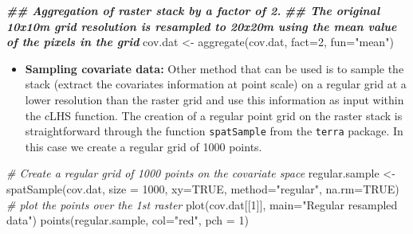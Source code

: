 \documentclass[
  10pt,
  b5paper,
  oneside]{book}
\newenvironment{Shaded}{\begin{snugshade}}{\end{snugshade}}
\newcommand{\AttributeTok}[1]{\textcolor[rgb]{0.77,0.63,0.00}{#1}}
\newcommand{\CommentTok}[1]{\textcolor[rgb]{0.56,0.35,0.01}{\textit{#1}}}
\newcommand{\ConstantTok}[1]{\textcolor[rgb]{0.00,0.00,0.00}{#1}}
\newcommand{\DecValTok}[1]{\textcolor[rgb]{0.00,0.00,0.81}{#1}}
\newcommand{\DocumentationTok}[1]{\textcolor[rgb]{0.56,0.35,0.01}{\textbf{\textit{#1}}}}
\newcommand{\FunctionTok}[1]{\textcolor[rgb]{0.00,0.00,0.00}{#1}}
\newcommand{\NormalTok}[1]{#1}
\newcommand{\OtherTok}[1]{\textcolor[rgb]{0.56,0.35,0.01}{#1}}
\newcommand{\StringTok}[1]{\textcolor[rgb]{0.31,0.60,0.02}{#1}}
\providecommand{\tightlist}{%
  \setlength{\itemsep}{0pt}\setlength{\parskip}{0pt}}
\begin{document}
\begin{Shaded}
\begin{Highlighting}[]
  \DocumentationTok{\#\# Aggregation of raster stack by a factor of 2. }
  \DocumentationTok{\#\# The original 10x10m grid resolution is resampled to 20x20m using the mean value of the pixels in the grid}
\NormalTok{    cov.dat }\OtherTok{\textless{}{-}} \FunctionTok{aggregate}\NormalTok{(cov.dat, }\AttributeTok{fact=}\DecValTok{2}\NormalTok{, }\AttributeTok{fun=}\StringTok{"mean"}\NormalTok{)}
\end{Highlighting}
\end{Shaded}

\begin{itemize}
\tightlist
\item
  \textbf{Sampling covariate data:} Other method that can be used is to sample the stack (extract the covariates information at point scale) on a regular grid at a lower resolution than the raster grid and use this information as input within the cLHS function. The creation of a regular point grid on the raster stack is straightforward through the function \texttt{spatSample} from the \texttt{\textquotesingle{}terra\textquotesingle{}} package. In this case we create a regular grid of 1000 points.
\end{itemize}

\begin{Shaded}
\begin{Highlighting}[]
  \CommentTok{\# Create a regular grid of 1000 points on the covariate space}
\NormalTok{    regular.sample }\OtherTok{\textless{}{-}} \FunctionTok{spatSample}\NormalTok{(cov.dat, }\AttributeTok{size =} \DecValTok{1000}\NormalTok{, }\AttributeTok{xy=}\ConstantTok{TRUE}\NormalTok{, }\AttributeTok{method=}\StringTok{"regular"}\NormalTok{, }\AttributeTok{na.rm=}\ConstantTok{TRUE}\NormalTok{)}
  \CommentTok{\# plot the points over the 1st raster}
    \FunctionTok{plot}\NormalTok{(cov.dat[[}\DecValTok{1}\NormalTok{]], }\AttributeTok{main=}\StringTok{"Regular resampled data"}\NormalTok{)}
    \FunctionTok{points}\NormalTok{(regular.sample, }\AttributeTok{col=}\StringTok{"red"}\NormalTok{, }\AttributeTok{pch =} \DecValTok{1}\NormalTok{)}
\end{Highlighting}
\end{Shaded}
\end{document}
